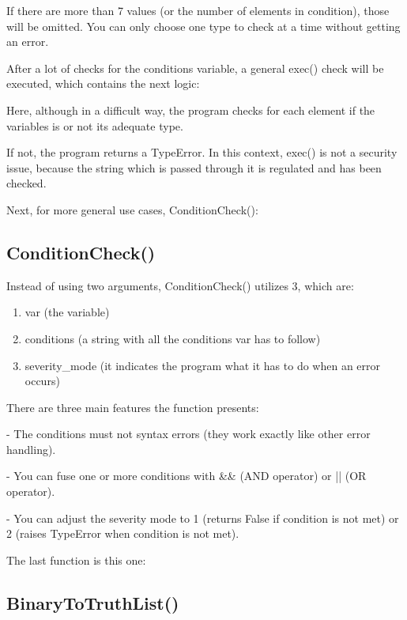 \documentclass{article}
\begin{document}
	If there are more than 7 values (or the number of elements in condition), those will be omitted. You can only choose one type to check at a time without getting an error.
	\newpage
	
	After a lot of checks for the conditions variable, a general exec() check will be executed, which contains the next logic:

	
	
	Here, although in a difficult way, the program checks for each element if the variables is or not its adequate type.
	
	If not, the program returns a TypeError.
	In this context, exec() is not a security issue, because the string which is passed through it is regulated and has been checked.
	
	Next, for more general use cases, ConditionCheck():
	\newpage
	
	\subsection{ConditionCheck()}
	
	\newpage
	
	Instead of using two arguments, ConditionCheck() utilizes 3, which are:
	
	\begin{enumerate}
		\item var (the variable)
		\item conditions (a string with all the conditions var has to follow)
		\item severity\_mode (it indicates the program what it has to do when an error occurs)
	\end{enumerate}
	
	There are three main features the function presents:
	
	- The conditions must not syntax errors (they work exactly like other error handling).
	
	- You can fuse one or more conditions with \&\& (AND operator) or || (OR operator).
	
	- You can adjust the severity mode to 1 (returns False if condition is not met) or 2 (raises TypeError when condition is not met).
	
	The last function is this one:
	
	\newpage
	\subsection{BinaryToTruthList()}
	
	
\end{document}
